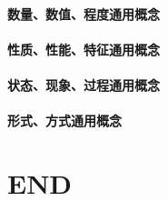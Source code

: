 \documentclass[UTF8]{../ApplicationUniverse}
\begin{document}
    \subsubsection{数量、数值、程度通用概念}
    \subsubsection{性质、性能、特征通用概念}
    \subsubsection{状态、现象、过程通用概念}
    \subsubsection{形式、方式通用概念}





\chapter{END}
\end{document}
